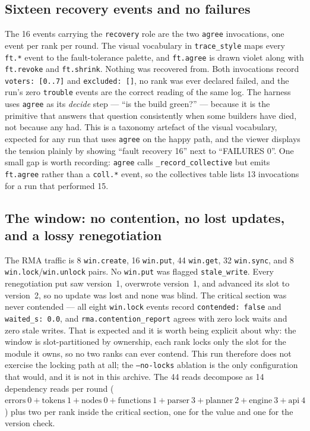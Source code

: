 \documentclass[11pt]{article}
\begin{document}
\subsection*{Sixteen recovery events and no failures}

The 16 events carrying the \texttt{recovery} role are the two \texttt{agree} invocations, one
event per rank per round. The visual vocabulary in \texttt{trace\_style} maps every
\texttt{ft.*} event to the fault-tolerance palette,
and \texttt{ft.agree} is drawn violet along with \texttt{ft.revoke} and \texttt{ft.shrink}.
Nothing was recovered from. Both invocations record \texttt{voters: [0..7]} and
\texttt{excluded: []}, no rank was ever declared failed, and the run's zero \texttt{trouble}
events are the correct reading of the same log. The harness uses \texttt{agree} as its
\emph{decide} step --- ``is the build green?'' --- because it is the primitive that answers
that question consistently when some builders have died, not because any had. This is a
taxonomy artefact of the visual vocabulary, expected for any run that uses \texttt{agree} on
the happy path, and the viewer displays the tension plainly by showing ``fault recovery 16''
next to ``FAILURES 0''. One small gap is worth recording: \texttt{agree} calls
\texttt{\_record\_collective} but emits \texttt{ft.agree} rather than a \texttt{coll.*} event,
so the collectives table lists 13 invocations for a run that performed 15.

\subsection*{The window: no contention, no lost updates, and a lossy renegotiation}

The RMA traffic is 8 \texttt{win.create}, 16 \texttt{win.put}, 44 \texttt{win.get}, 32
\texttt{win.sync}, and 8 \texttt{win.lock}/\texttt{win.unlock} pairs. No \texttt{win.put} was
flagged \texttt{stale\_write}. Every renegotiation put saw version~1, overwrote version~1, and
advanced its slot to version~2, so no update was lost and none was blind.
The critical section was never contended --- all eight \texttt{win.lock} events record
\texttt{contended: false} and \texttt{waited\_s: 0.0}, and \texttt{rma.contention\_report}
agrees with zero lock waits and zero stale writes. That is expected and it is worth being
explicit about why: the window is slot-partitioned by ownership, each rank locks only the slot
for the module it owns, so no two ranks can ever contend. This run therefore does not exercise
the locking path at all; the \texttt{--no-locks} ablation is the only configuration that would,
and it is not in this archive. The 44 reads decompose as 14 dependency reads per round
($\text{errors}~0 + \text{tokens}~1 + \text{nodes}~0 + \text{functions}~1 + \text{parser}~3 +
\text{planner}~2 + \text{engine}~3 + \text{api}~4$) plus two per rank inside the critical
section, one for the value and one for the version check.
\end{document}
